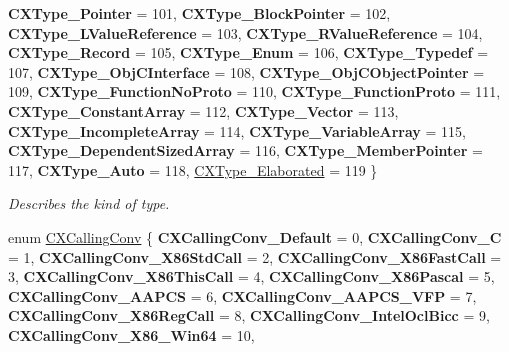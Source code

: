 \begin{DoxyCompactItemize}
{\bfseries C\+X\+Type\+\_\+\+Pointer} = 101, 
{\bfseries C\+X\+Type\+\_\+\+Block\+Pointer} = 102, 
\newline
{\bfseries C\+X\+Type\+\_\+\+L\+Value\+Reference} = 103, 
{\bfseries C\+X\+Type\+\_\+\+R\+Value\+Reference} = 104, 
{\bfseries C\+X\+Type\+\_\+\+Record} = 105, 
{\bfseries C\+X\+Type\+\_\+\+Enum} = 106, 
\newline
{\bfseries C\+X\+Type\+\_\+\+Typedef} = 107, 
{\bfseries C\+X\+Type\+\_\+\+Obj\+C\+Interface} = 108, 
{\bfseries C\+X\+Type\+\_\+\+Obj\+C\+Object\+Pointer} = 109, 
{\bfseries C\+X\+Type\+\_\+\+Function\+No\+Proto} = 110, 
\newline
{\bfseries C\+X\+Type\+\_\+\+Function\+Proto} = 111, 
{\bfseries C\+X\+Type\+\_\+\+Constant\+Array} = 112, 
{\bfseries C\+X\+Type\+\_\+\+Vector} = 113, 
{\bfseries C\+X\+Type\+\_\+\+Incomplete\+Array} = 114, 
\newline
{\bfseries C\+X\+Type\+\_\+\+Variable\+Array} = 115, 
{\bfseries C\+X\+Type\+\_\+\+Dependent\+Sized\+Array} = 116, 
{\bfseries C\+X\+Type\+\_\+\+Member\+Pointer} = 117, 
{\bfseries C\+X\+Type\+\_\+\+Auto} = 118, 
\newline
\hyperlink{group__CINDEX__TYPES_ggaad39de597b13a18882c21860f92b095aae4be029a6e7ee445186caafb14ef7b6b}{C\+X\+Type\+\_\+\+Elaborated} = 119
 \}\begin{DoxyCompactList}\small\item\em Describes the kind of type. \end{DoxyCompactList}
\item 
\mbox{\label{group__CINDEX__TYPES_ga4a0e941ec7b4b64bf9eb3d0ed49d55ae}} 
enum \hyperlink{group__CINDEX__TYPES_ga4a0e941ec7b4b64bf9eb3d0ed49d55ae}{C\+X\+Calling\+Conv} \{ \newline
{\bfseries C\+X\+Calling\+Conv\+\_\+\+Default} = 0, 
{\bfseries C\+X\+Calling\+Conv\+\_\+C} = 1, 
{\bfseries C\+X\+Calling\+Conv\+\_\+\+X86\+Std\+Call} = 2, 
{\bfseries C\+X\+Calling\+Conv\+\_\+\+X86\+Fast\+Call} = 3, 
\newline
{\bfseries C\+X\+Calling\+Conv\+\_\+\+X86\+This\+Call} = 4, 
{\bfseries C\+X\+Calling\+Conv\+\_\+\+X86\+Pascal} = 5, 
{\bfseries C\+X\+Calling\+Conv\+\_\+\+A\+A\+P\+CS} = 6, 
{\bfseries C\+X\+Calling\+Conv\+\_\+\+A\+A\+P\+C\+S\+\_\+\+V\+FP} = 7, 
\newline
{\bfseries C\+X\+Calling\+Conv\+\_\+\+X86\+Reg\+Call} = 8, 
{\bfseries C\+X\+Calling\+Conv\+\_\+\+Intel\+Ocl\+Bicc} = 9, 
{\bfseries C\+X\+Calling\+Conv\+\_\+\+X86\+\_\+Win64} = 10, 

\end{DoxyCompactItemize}
